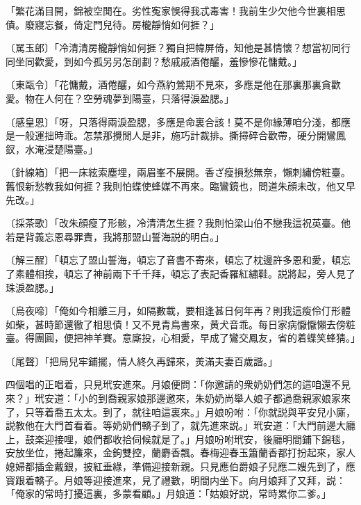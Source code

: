 \begin{myquote}
「繁花滿目開，錦被空閒在。劣性寃家悞得我忒毒害！我前生少欠他今世裏相思債。廢寢忘餐，倚定門兒待。房櫳靜悄如何捱？」

{\markfont〔駡玉郎〕}「冷清清房櫳靜悄如何捱？獨自把幃屏倚，知他是甚情懷？想當初同行同坐同歡愛，到如今孤另另怎㓦劃？愁戚戚酒倦釃，羞慘慘花慵戴。」

{\markfont〔東甌令〕}「花慵戴，酒倦釃，如今燕約鶯期不見來，多應是他在那裏那裏貪歡愛。物在人何在？空勞魂夢到陽臺，只落得淚盈腮。」

{\markfont〔感皇恩〕}「呀，只落得兩淚盈腮，多應是命裏合該！莫不是你緣薄咱分淺，都應是一般運拙時乖。怎禁那攪閒人是非，施巧計裁排。撕撏碎合歡帶，硬分開鸞鳳釵，水淹浸楚陽臺。」

{\markfont〔針線箱〕}「把一床絃索塵埋，兩眉峯不展開。香ざ瘦損愁無奈，懶刺繡傍粧臺。舊恨新愁教我如何捱？我則怕蝶使蜂媒不再來。臨鸞鏡也，問道朱顔未改，他又早先改。」

{\markfont〔採茶歌〕}「改朱顔瘦了形骸，冷清清怎生捱？我則怕梁山伯不戀我這祝英臺。他若是背義忘恩尋罪責，我將那盟山誓海説的明白。」

{\markfont〔解三酲〕}「頓忘了盟山誓海，頓忘了音書不寄來，頓忘了枕邊許多恩和愛，頓忘了素體相挨，頓忘了神前兩下千千拜，頓忘了表記香羅紅繡鞋。説將起，旁人見了珠淚盈腮。」

{\markfont〔烏夜啼〕}「俺如今相離三月，如隔數載，要相逢甚日何年再？則我這瘦伶仃形體如柴，甚時節還徹了相思債！又不見青鳥書來，黄犬音乖。每日家病懨懨懶去傍粧臺。得團圓，便把神羊賽。意廝投，心相愛，早成了鸞交鳳友，省的着蝶笑蜂猜。」

{\markfont〔尾聲〕}「把局兒牢鋪擺，情人終久再歸來，羙滿夫妻百歲諧。」
\end{myquote}

四個唱的正唱着，只見玳安進來。月娘便問：「你邀請的衆奶奶們怎的這咱還不見來？」玳安道：「小的到喬親家娘那邊邀來，朱奶奶尚舉人娘子都過喬親家娘家來了，只等着喬五太太。到了，就往咱這裏來。」月娘吩咐：「你就説與平安兒小廝，説教他在大門首看着。等奶奶們轎子到了，就先進來説。」玳安道：「大門前邊大廳上，鼓楽迎接哩，娘們都收拾伺候就是了。」月娘吩咐玳安，後廳明間鋪下錦毯，安放坐位，捲起簾來，金鉤雙控，蘭麝香飄。春梅迎春玉簫蘭香都打扮起來，家人媳婦都插金戴銀，披紅垂綠，準備迎接新親。只見應伯爵娘子兒應二嫂先到了，應寳跟着轎子。月娘等迎接進來，見了禮數，明間内坐下。向月娘拜了又拜，説：「俺家的常時打擾這裏，多蒙看顧。」月娘道：「姑娘好説，常時累你二爹。」

